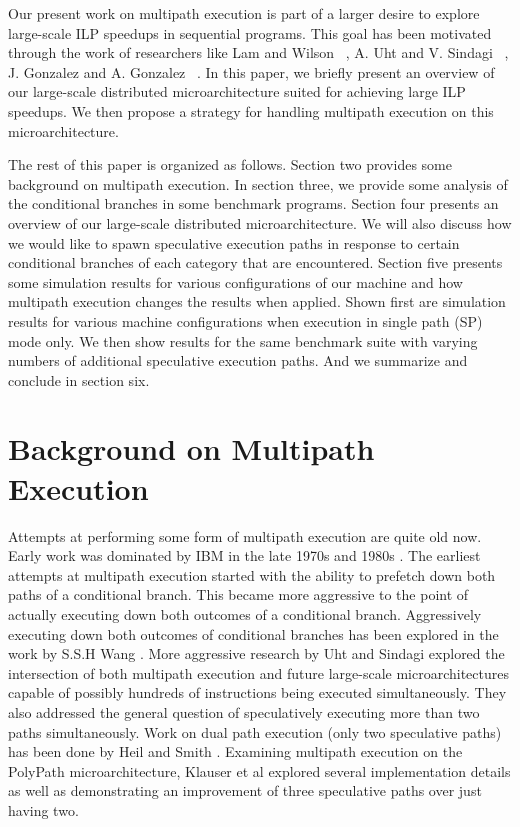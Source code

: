 \documentclass[10pt,dvips]{article}
\begin{document}
Our present work on multipath execution is part of a larger
desire to explore large-scale ILP speedups in sequential programs.
This goal has been motivated through the work of researchers like
Lam and Wilson
~\cite{Lam92},
A. Uht and V. Sindagi ~\cite{Uht95},
J. Gonzalez and A. Gonzalez ~\cite{Gon97}.
In this paper, we briefly present an overview of our large-scale distributed
microarchitecture suited for achieving large ILP speedups.  
We then propose a strategy for handling
multipath execution on this microarchitecture.

The rest of this paper is organized as follows.
Section two provides some background on multipath execution.
In section three, we provide some analysis of the conditional
branches in some benchmark programs.  
Section four presents an overview of our large-scale distributed
microarchitecture.
We will also discuss how we
would like to 
spawn speculative execution paths
in response to certain conditional branches of each category that 
are encountered.
Section five presents some simulation results for various
configurations of our machine and how multipath execution
changes the results when applied.  Shown first are simulation
results for various machine configurations when execution in
single path (SP) mode only.  We then show results for
the same benchmark suite with varying numbers of additional
speculative execution paths.
And we summarize and conclude in section six.
%
\section{Background on Multipath Execution}
%
Attempts at performing some form of multipath execution 
are quite old now.  Early work was dominated by IBM in the
late 1970s and 1980s \cite{Conners79}.
The earliest attempts at multipath
execution started with the ability to prefetch down both
paths of a conditional branch.  This became more aggressive
to the point of actually executing down both outcomes of
a conditional branch.  Aggressively executing down both outcomes
of conditional branches has been explored in the work
by S.S.H Wang \cite{Wang90}.  
More aggressive research by Uht and
Sindagi \cite{Uht95} explored the intersection of both
multipath execution and future large-scale microarchitectures
capable of possibly hundreds of instructions being executed simultaneously.
They also addressed the general question of speculatively executing
more than two paths simultaneously.
Work on dual path execution (only two speculative paths) has
been done by Heil and Smith \cite{Heil96}.
Examining multipath execution on the PolyPath microarchitecture,
Klauser et al explored several implementation details
as well as demonstrating an improvement of three speculative paths
over just having two.
\end{document}

